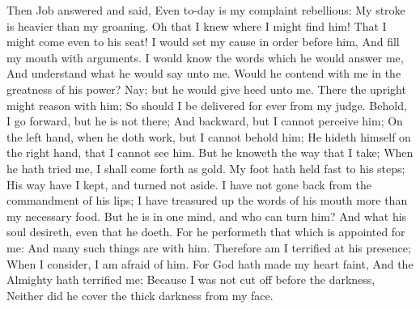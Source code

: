 Then Job answered and said,  Even to-day is my complaint rebellious: My stroke is heavier than my groaning.  Oh that I knew where I might find him! That I might come even to his seat!  I would set my cause in order before him, And fill my mouth with arguments.  I would know the words which he would answer me, And understand what he would say unto me.  Would he contend with me in the greatness of his power? Nay; but he would give heed unto me.  There the upright might reason with him; So should I be delivered for ever from my judge.  Behold, I go forward, but he is not there; And backward, but I cannot perceive him;  On the left hand, when he doth work, but I cannot behold him; He hideth himself on the right hand, that I cannot see him.  But he knoweth the way that I take; When he hath tried me, I shall come forth as gold.  My foot hath held fast to his steps; His way have I kept, and turned not aside.  I have not gone back from the commandment of his lips; I have treasured up the words of his mouth more than my necessary food.  But he is in one mind, and who can turn him? And what his soul desireth, even that he doeth.  For he performeth that which is appointed for me: And many such things are with him.  Therefore am I terrified at his presence; When I consider, I am afraid of him.  For God hath made my heart faint, And the Almighty hath terrified me;  Because I was not cut off before the darkness, Neither did he cover the thick darkness from my face. 

